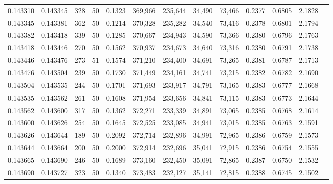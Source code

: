 \begin{tabular}{rrrrrrrrrrrrr}
0.143310 & 0.143345 &   328 &  50 &                                     0.1323 & 369,966 & 235,644 &  34,490 &  73,466 & 0.2377 & 0.6805 & 2.1828 \\
0.143345 & 0.143381 &   362 &  50 &                                     0.1214 & 370,328 & 235,282 &  34,540 &  73,416 & 0.2378 & 0.6801 & 2.1794 \\
0.143382 & 0.143418 &   339 &  50 &                                     0.1285 & 370,667 & 234,943 &  34,590 &  73,366 & 0.2380 & 0.6796 & 2.1763 \\
0.143418 & 0.143446 &   270 &  50 &                                     0.1562 & 370,937 & 234,673 &  34,640 &  73,316 & 0.2380 & 0.6791 & 2.1738 \\
0.143446 & 0.143476 &   273 &  51 &                                     0.1574 & 371,210 & 234,400 &  34,691 &  73,265 & 0.2381 & 0.6787 & 2.1713 \\
0.143476 & 0.143504 &   239 &  50 &                                     0.1730 & 371,449 & 234,161 &  34,741 &  73,215 & 0.2382 & 0.6782 & 2.1690 \\
0.143504 & 0.143535 &   244 &  50 &                                     0.1701 & 371,693 & 233,917 &  34,791 &  73,165 & 0.2383 & 0.6777 & 2.1668 \\
0.143535 & 0.143562 &   261 &  50 &                                     0.1608 & 371,954 & 233,656 &  34,841 &  73,115 & 0.2383 & 0.6773 & 2.1644 \\
0.143562 & 0.143600 &   317 &  50 &                                     0.1362 & 372,271 & 233,339 &  34,891 &  73,065 & 0.2385 & 0.6768 & 2.1614 \\
0.143600 & 0.143626 &   254 &  50 &                                     0.1645 & 372,525 & 233,085 &  34,941 &  73,015 & 0.2385 & 0.6763 & 2.1591 \\
0.143626 & 0.143644 &   189 &  50 &                                     0.2092 & 372,714 & 232,896 &  34,991 &  72,965 & 0.2386 & 0.6759 & 2.1573 \\
0.143644 & 0.143664 &   200 &  50 &                                     0.2000 & 372,914 & 232,696 &  35,041 &  72,915 & 0.2386 & 0.6754 & 2.1555 \\
0.143665 & 0.143690 &   246 &  50 &                                     0.1689 & 373,160 & 232,450 &  35,091 &  72,865 & 0.2387 & 0.6750 & 2.1532 \\
0.143690 & 0.143727 &   323 &  50 &                                     0.1340 & 373,483 & 232,127 &  35,141 &  72,815 & 0.2388 & 0.6745 & 2.1502 \\

\end{tabular}
